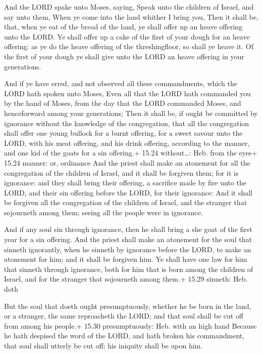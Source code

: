  And the LORD spake unto Moses, saying, 
Speak unto the children of Israel, and say unto them, When ye come into
the land whither I bring you,  Then it shall be, that, when
ye eat of the bread of the land, ye shall offer up an heave offering
unto the LORD.  Ye shall offer up a cake of the first of
your dough for an heave offering: as ye do the heave offering of the
threshingfloor, so shall ye heave it.  Of the first of your
dough ye shall give unto the LORD an heave offering in your generations.

 And if ye have erred, and not observed all these
commandments, which the LORD hath spoken unto Moses,  Even
all that the LORD hath commanded you by the hand of Moses, from the day
that the LORD commanded Moses, and henceforward among your generations;
 Then it shall be, if ought be committed by ignorance
without the knowledge of the congregation, that all the congregation
shall offer one young bullock for a burnt offering, for a sweet savour
unto the LORD, with his meat offering, and his drink offering, according
to the manner, and one kid of the goats for a sin offering.+ 15.24
without\ldots: Heb. from the eyes+ 15.24 manner: or, ordinance
 And the priest shall make an atonement for all the
congregation of the children of Israel, and it shall be forgiven them;
for it is ignorance: and they shall bring their offering, a sacrifice
made by fire unto the LORD, and their sin offering before the LORD, for
their ignorance:  And it shall be forgiven all the
congregation of the children of Israel, and the stranger that sojourneth
among them; seeing all the people were in ignorance.

 And if any soul sin through ignorance, then he shall
bring a she goat of the first year for a sin offering.  And
the priest shall make an atonement for the soul that sinneth ignorantly,
when he sinneth by ignorance before the LORD, to make an atonement for
him; and it shall be forgiven him.  Ye shall have one law
for him that sinneth through ignorance, both for him that is born among
the children of Israel, and for the stranger that sojourneth among
them.+ 15.29 sinneth: Heb. doth

 But the soul that doeth ought presumptuously, whether he
be born in the land, or a stranger, the same reproacheth the LORD; and
that soul shall be cut off from among his people.+ 15.30 presumptuously:
Heb. with an high hand  Because he hath despised the word
of the LORD, and hath broken his commandment, that soul shall utterly be
cut off; his iniquity shall be upon him.

